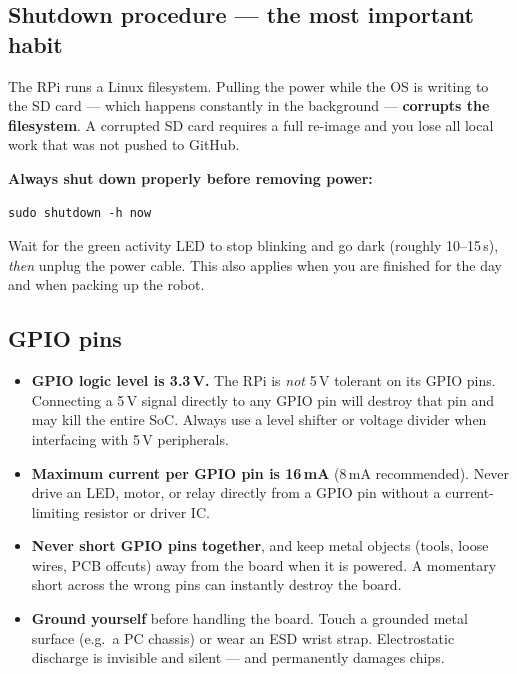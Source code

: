 \documentclass{ol-softwaremanual}
\begin{document}
\subsection*{Shutdown procedure --- the most important habit}

The RPi runs a Linux filesystem.
Pulling the power while the OS is writing to the SD card --- which happens
constantly in the background --- \textbf{corrupts the filesystem}.
A corrupted SD card requires a full re-image and you lose all local work that
was not pushed to GitHub.

\medskip
\noindent\textbf{Always shut down properly before removing power:}

\begin{verbatim}
sudo shutdown -h now
\end{verbatim}

Wait for the green activity LED to stop blinking and go dark (roughly 10--15\,s),
\emph{then} unplug the power cable.
This also applies when you are finished for the day and when packing up the robot.

\subsection*{GPIO pins}

\begin{itemize}
  \item \textbf{GPIO logic level is 3.3\,V.}
        The RPi is \emph{not} 5\,V tolerant on its GPIO pins.
        Connecting a 5\,V signal directly to any GPIO pin will destroy that
        pin and may kill the entire SoC.
        Always use a level shifter or voltage divider when interfacing with
        5\,V peripherals.
  \item \textbf{Maximum current per GPIO pin is 16\,mA} (8\,mA recommended).
        Never drive an LED, motor, or relay directly from a GPIO pin without a
        current-limiting resistor or driver IC.
  \item \textbf{Never short GPIO pins together}, and keep metal objects (tools,
        loose wires, PCB offcuts) away from the board when it is powered.
        A momentary short across the wrong pins can instantly destroy the board.
  \item \textbf{Ground yourself} before handling the board.
        Touch a grounded metal surface (e.g.\ a PC chassis) or wear an ESD
        wrist strap.
        Electrostatic discharge is invisible and silent --- and permanently damages
        chips.
\end{itemize}
\end{document}

